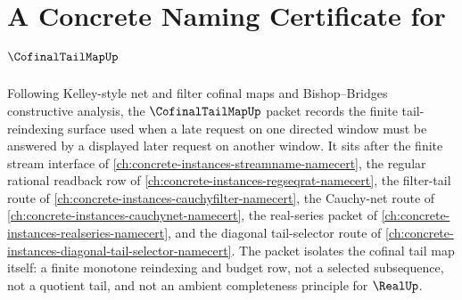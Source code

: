 \chapter{A Concrete Naming Certificate for $\CofinalTailMapUp$}
\label{ch:concrete-instances-cofinal-tail-map-namecert}

Following Kelley-style net and filter cofinal maps and Bishop--Bridges constructive analysis, the $\CofinalTailMapUp$ packet records the finite tail-reindexing surface used when a late request on one directed window must be answered by a displayed later request on another window. It sits after the finite stream interface of \autoref{ch:concrete-instances-streamname-namecert}, the regular rational readback row of \autoref{ch:concrete-instances-regseqrat-namecert}, the filter-tail route of \autoref{ch:concrete-instances-cauchyfilter-namecert}, the Cauchy-net route of \autoref{ch:concrete-instances-cauchynet-namecert}, the real-series packet of \autoref{ch:concrete-instances-realseries-namecert}, and the diagonal tail-selector route of \autoref{ch:concrete-instances-diagonal-tail-selector-namecert}. The packet isolates the cofinal tail map itself: a finite monotone reindexing and budget row, not a selected subsequence, not a quotient tail, and not an ambient completeness principle for $\RealUp$.

